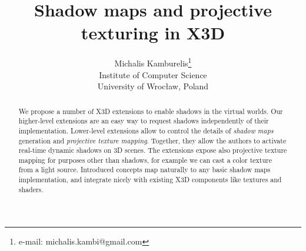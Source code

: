 \documentclass{acmsiggraph}                     %
\title{Shadow maps and projective texturing in X3D}
\author{Michalis Kamburelis\thanks{e-mail: michalis.kambi@gmail.com}\\Institute of Computer Science\\University of Wroc{\l}aw, Poland}
\begin{document}

\maketitle

\begin{abstract}
We propose a number of X3D extensions to enable shadows in the virtual worlds.
Our higher-level extensions are an easy way to request shadows
independently of their implementation.
Lower-level extensions allow to control the details of
\emph{shadow maps} generation and \emph{projective texture mapping}.
Together, they allow the authors to activate real-time dynamic shadows
on 3D scenes. The extensions expose also projective texture mapping
for purposes other than shadows, for example we can cast a color texture
from a light source. Introduced concepts map naturally to any basic
shadow maps implementation,
and integrate nicely with existing X3D components like textures and shaders.
\end{abstract}
\end{document}
